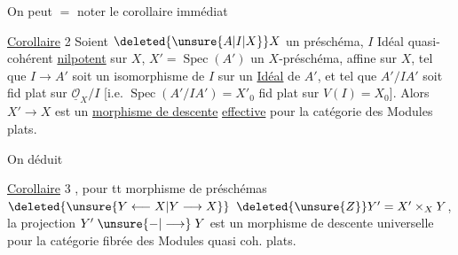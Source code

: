 On peut $=$ noter le corollaire immédiat

\uline{Corollaire} 2 \quad Soient $\deleted{\unsure{A|I|X}} X$ un préschéma, $I$  Idéal quasi-cohérent \uline{nilpotent} sur $X$, $X'=\operatorname{Spec}(A')$ un $X$-préschéma, affine sur $X$, tel que $I\longrightarrow A'$ soit un isomorphisme de $I$ sur un \uline{Idéal} de $A'$, et tel que $A'/IA'$ soit fid plat sur $\underline{\mathcal O}_X/I$ [i.e. $\operatorname{Spec}(A'/IA')=X'_0$ fid plat sur $V(I)=X_0$]. Alors $X'\longrightarrow X$ est un \uline{morphisme de descente} \uline{effective} pour la catégorie  des Modules  plats.

On   déduit

\uline{Corollaire} 3 \quad {} , pour tt morphisme  de préschémas $\deleted{\unsure{Y\longleftarrow X|Y\longrightarrow X}}$   $\deleted{\unsure{Z}}Y'=X'\times_X Y$,  la projection $Y'\mathrel{\unsure{-|\longrightarrow}}Y$ est un morphisme de descente  universelle pour la catégorie fibrée des Modules quasi coh. plats.
